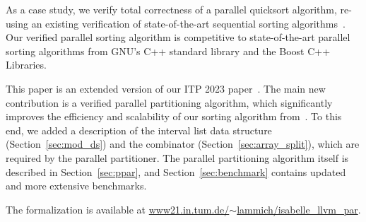 \documentclass[sn-mathphys,Numbered]{sn-jnl}
\theoremstyle{thmstyleone}%
\theoremstyle{definition}%
\theoremstyle{thmstylethree}%
\begin{document}
As a case study, we verify total correctness of a parallel quicksort algorithm,
re-using an existing verification of state-of-the-art sequential sorting algorithms~\cite{La20}.
Our verified parallel sorting algorithm is competitive to state-of-the-art parallel sorting algorithms
from GNU's C++ standard library and the Boost C++ Libraries.

This paper is an extended version of our ITP 2023 paper~\cite{La22}.
The main new contribution is a verified parallel partitioning algorithm,
which significantly improves the efficiency and scalability of our sorting algorithm from~\cite{La22}.
To this end, we added a description of the interval list data structure (Section~\ref{sec:mod_ds})
and the  combinator (Section~\ref{sec:array_split}), which are required by the parallel partitioner.
The parallel partitioning algorithm itself is described in Section~\ref{sec:ppar}, and Section~\ref{sec:benchmark}
contains updated and more extensive benchmarks.




%
%

\noindent The formalization is available at \href{https://www21.in.tum.de/~lammich/isabelle_llvm_par/}{www21.in.tum.de/$\sim$lammich/isabelle\_llvm\_par}.
\end{document}
